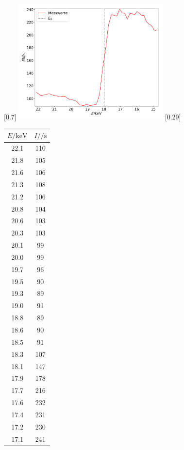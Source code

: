\begin{figure}
  \centering
  [0.7\textwidth]{
  \includegraphics[width=0.7\textwidth]{zirkonium.pdf}
  }
  \hfill
  [0.29\textwidth]{
  \begin{tabular}{c c}
    \toprule
    $E / \si{\kilo\electronvolt}$ & $I / \si{\per\second}$ \\
    \midrule
    22.1 & 110 \\
    21.8 & 105 \\
    21.6 & 106 \\
    21.3 & 108 \\
    21.2 & 106 \\
    20.8 & 104 \\
    20.6 & 103 \\
    20.3 & 103 \\
    20.1 & 99 \\
    20.0 & 99 \\
    19.7 & 96 \\
    19.5 & 90 \\
    19.3 & 89 \\
    19.0 & 91 \\
    18.8 & 89 \\
    18.6 & 90 \\
    18.5 & 91 \\
    18.3 & 107 \\
    18.1 & 147 \\
    17.9 & 178 \\
    17.7 & 216 \\
    17.6 & 232 \\
    17.4 & 231 \\
    17.2 & 230 \\
    17.1 & 241 \\

\end{tabular}}
\end{figure}

